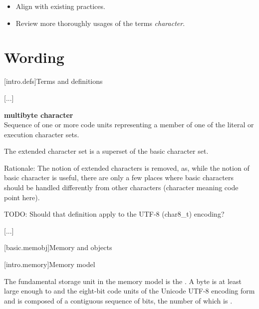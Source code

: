 \documentclass{wg21}
\begin{document}
\begin{itemize}
\item Align  with existing practices.
\item Review more thoroughly usages of the terms \emph{character}.
\end{itemize}

\section{Wording}



[intro.defs]{Terms and definitions}

[...]

\textbf{multibyte character}\\
{Sequence of one or more code units representing a member of one of the literal or execution character sets.}

\begin{removedblock}
\begin{note}
    The extended character set is a superset of the basic character
    set.
\end{note}
\end{removedblock}

\begin{quoteblock}
Rationale: The notion of extended characters is removed, as, while the notion of basic character is useful,
there are only a few places where basic characters should be handled differently from other characters (character meaning code point here).

TODO: Should that definition apply to the UTF-8 (char8_t) encoding?
\end{quoteblock}



[...]

[basic.memobj]{Memory and objects}

[intro.memory]{Memory model}

\pnum
{}%
The fundamental storage unit in the \Cpp{} memory model is the
.
A byte is at least large enough to 
and the eight-bit code units of the Unicode
UTF-8 encoding form
and is composed of a contiguous sequence of
bits, the number of which is .
\end{document}
